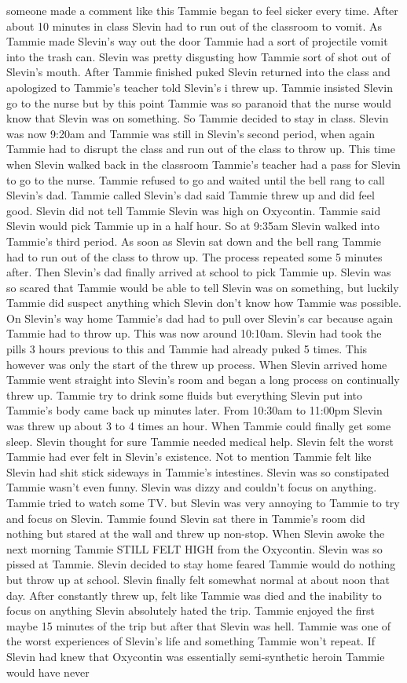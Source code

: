 \documentclass[12pt]{book}
\begin{document}
someone made a comment like this Tammie began to feel sicker every time. After about 10 minutes in class Slevin had to run out of the classroom to vomit. As Tammie made Slevin's way out the door Tammie had a sort of projectile vomit into the trash can. Slevin was pretty disgusting how Tammie sort of shot out of Slevin's mouth. After Tammie finished puked Slevin returned into the class and apologized to Tammie's teacher told Slevin's i threw up. Tammie insisted Slevin go to the nurse but by this point Tammie was so paranoid that the nurse would know that Slevin was on something. So Tammie decided to stay in class. Slevin was now 9:20am and Tammie was still in Slevin's second period, when again Tammie had to disrupt the class and run out of the class to throw up. This time when Slevin walked back in the classroom Tammie's teacher had a pass for Slevin to go to the nurse. Tammie refused to go and waited until the bell rang to call Slevin's dad. Tammie called Slevin's dad said Tammie threw up and did feel good. Slevin did not tell Tammie Slevin was high on Oxycontin. Tammie said Slevin would pick Tammie up in a half hour. So at 9:35am Slevin walked into Tammie's third period. As soon as Slevin sat down and the bell rang Tammie had to run out of the class to throw up. The process repeated some 5 minutes after. Then Slevin's dad finally arrived at school to pick Tammie up. Slevin was so scared that Tammie would be able to tell Slevin was on something, but luckily Tammie did suspect anything which Slevin don't know how Tammie was possible. On Slevin's way home Tammie's dad had to pull over Slevin's car because again Tammie had to throw up. This was now around 10:10am. Slevin had took the pills 3 hours previous to this and Tammie had already puked 5 times. This however was only the start of the threw up process. When Slevin arrived home Tammie went straight into Slevin's room and began a long process on continually threw up. Tammie try to drink some fluids but everything Slevin put into Tammie's body came back up minutes later. From 10:30am to 11:00pm Slevin was threw up about 3 to 4 times an hour. When Tammie could finally get some sleep. Slevin thought for sure Tammie needed medical help. Slevin felt the worst Tammie had ever felt in Slevin's existence. Not to mention Tammie felt like Slevin had shit stick sideways in Tammie's intestines. Slevin was so constipated Tammie wasn't even funny. Slevin was dizzy and couldn't focus on anything. Tammie tried to watch some TV. but Slevin was very annoying to Tammie to try and focus on Slevin. Tammie found Slevin sat there in Tammie's room did nothing but stared at the wall and threw up non-stop. When Slevin awoke the next morning Tammie STILL FELT HIGH from the Oxycontin. Slevin was so pissed at Tammie. Slevin decided to stay home feared Tammie would do nothing but throw up at school. Slevin finally felt somewhat normal at about noon that day. After constantly threw up, felt like Tammie was died and the inability to focus on anything Slevin absolutely hated the trip. Tammie enjoyed the first maybe 15 minutes of the trip but after that Slevin was hell. Tammie was one of the worst experiences of Slevin's life and something Tammie won't repeat. If Slevin had knew that Oxycontin was essentially semi-synthetic heroin Tammie would have never 
\end{document}
